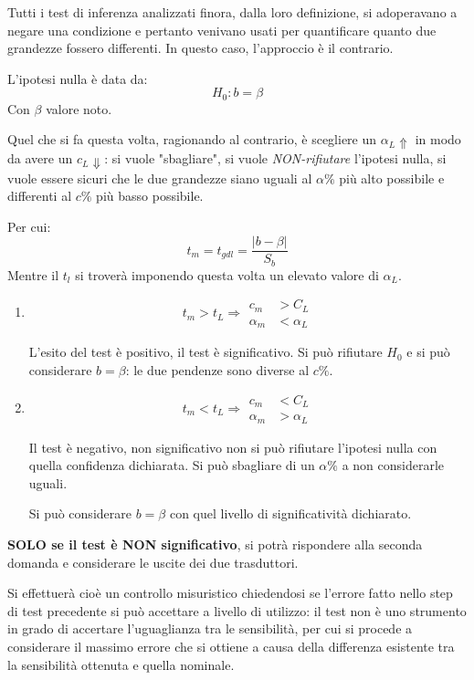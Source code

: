 \documentclass[a4paper, 15pt]{article}
\begin{document}
\begin{adjustwidth}{2in}{}
	Tutti i test di inferenza analizzati finora, dalla loro definizione, si adoperavano a negare una condizione e pertanto venivano usati per quantificare quanto due grandezze fossero differenti. In questo caso, l'approccio è il contrario. \newline
	
	L'ipotesi nulla è data da: \[ H_0: b = \beta\] Con $\beta$ valore noto. 
	
	Quel che si fa questa volta, ragionando al contrario, è scegliere un $\alpha_L\Uparrow$ in modo da avere un $c_L\Downarrow$: si vuole "sbagliare", si vuole \textit{NON-rifiutare} l'ipotesi nulla, si vuole essere sicuri che le due grandezze siano uguali al $\alpha\%$ più alto possibile e differenti al $c\%$ più basso possibile. \newline

	Per cui: 
	\[t_m = t_{gdl} = \dfrac{\left|b-\beta\right|}{S_b}\]
	Mentre il $t_l$ si troverà imponendo questa volta un elevato valore di $\alpha_L$.
	
	\begin{enumerate}
		\item \[t_m>t_L \Rightarrow \begin{aligned}
			c_m&>C_L \\
			\alpha_m&<\alpha_L
		\end{aligned}\]
		
		L'esito del test è positivo, il test è significativo. Si può rifiutare $H_0$ e si può considerare $b=\beta$: le due pendenze sono diverse al $c\%$. 
		
		\item \[t_m<t_L \Rightarrow \begin{aligned}
			c_m&<C_L \\
			\alpha_m&>\alpha_L
		\end{aligned}\]
		
		Il test è negativo, non significativo non si può rifiutare l'ipotesi nulla con quella confidenza dichiarata. Si può sbagliare di un $\alpha\%$ a non considerarle uguali. 
		
		Si può considerare $b=\beta$ con quel livello di significatività dichiarato. 
	\end{enumerate}
	\textbf{SOLO se il test è NON significativo}, si potrà rispondere alla seconda domanda e considerare le uscite dei due trasduttori. 
	
	Si effettuerà cioè un controllo misuristico chiedendosi se l'errore fatto nello step di test precedente si può accettare a livello di utilizzo: il test non è uno strumento in grado di accertare
	l’uguaglianza tra le sensibilità, per cui si procede a considerare il massimo errore che si
	ottiene a causa della differenza esistente tra la sensibilità ottenuta e quella nominale.
	

\end{adjustwidth}
\end{document}
